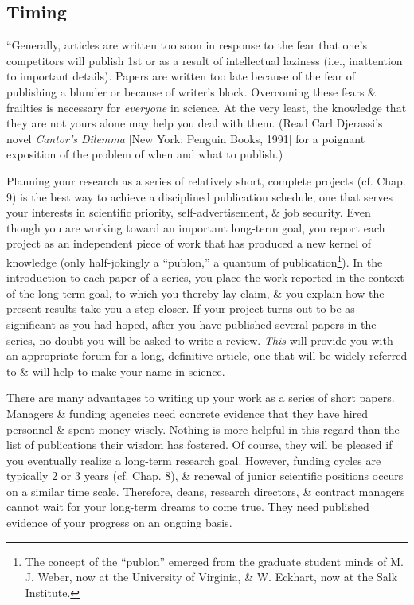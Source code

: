 \documentclass{article}
\numberwithin{equation}{section}
\begin{document}
\subsection{Timing}
``Generally, articles are written too soon in response to the fear that one's competitors will publish 1st or as a result of intellectual laziness (i.e., inattention to important details). Papers are written too late because of the fear of publishing a blunder or because of writer's block. Overcoming these fears \& frailties is necessary for \textit{everyone} in science. At the very least, the knowledge that they are not yours alone may help you deal with them. (Read Carl Djerassi's novel \textit{Cantor's Dilemma} [New York: Penguin Books, 1991] for a poignant exposition of the problem of when and what to publish.)

Planning your research as a series of relatively short, complete projects (cf. Chap. 9) is the best way to achieve a disciplined publication schedule, one that serves your interests in scientific priority, self-advertisement, \& job security. Even though you are working toward an important long-term goal, you report each project as an independent piece of work that has produced a new kernel of knowledge (only half-jokingly a ``publon,'' a quantum of publication\footnote{The concept of the ``publon'' emerged from the graduate student minds of M. J. Weber, now at the University of Virginia, \& W. Eckhart, now at the Salk Institute.}). In the introduction to each paper of a series, you place the work reported in the context of the long-term goal, to which you thereby lay claim, \& you explain how the present results take you a step closer. If your project turns out to be as significant as you had hoped, after you have published several papers in the series, no doubt you will be asked to write a review. \textit{This} will provide you with an appropriate forum for a long, definitive article, one that will be widely referred to \& will help to make your name in science.

There are many advantages to writing up your work as a series of short papers. Managers \& funding agencies need concrete evidence that they have hired personnel \& spent money wisely. Nothing is more helpful in this regard than the list of publications their wisdom has fostered. Of course, they will be pleased if you eventually realize a long-term research goal. However, funding cycles are typically 2 or 3 years (cf. Chap. 8), \& renewal of junior scientific positions occurs on a similar time scale. Therefore, deans, research directors, \& contract managers cannot wait for your long-term dreams to come true. They need published evidence of your progress on an ongoing basis.
\end{document}
